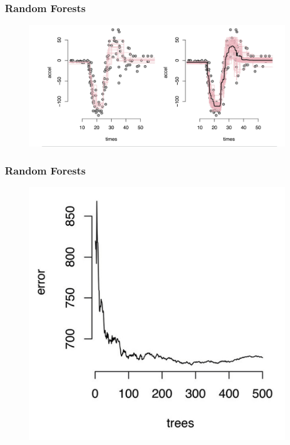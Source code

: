 \documentclass[
  shownotes,
  xcolor={svgnames},
  hyperref={colorlinks,citecolor=DarkBlue,linkcolor=DarkRed,urlcolor=DarkBlue}
  , aspectratio=169]{beamer}
\begin{document}
\begin{frame}[fragile]
\frametitle{Random Forests}

\begin{figure}[H] \centering
            \captionsetup{justification=centering}
              \includegraphics[scale=0.25]{figures/accel_2}
 \end{figure}
\end{frame}

\begin{frame}[fragile]
\frametitle{Random Forests}

\begin{figure}[H] \centering
            \captionsetup{justification=centering}
              \includegraphics[scale=0.25]{figures/accel_3}
 \end{figure}
\end{frame}
\end{document}
